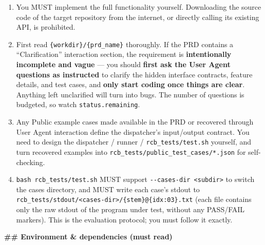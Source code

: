 \begin{promptbox}
\begin{enumerate}
\item You MUST implement the full functionality yourself. Downloading the source code of the target repository from the internet, or directly calling its existing API, is prohibited.
\item First read \texttt{\{workdir\}/\{prd\_name\}} thoroughly. If the PRD contains a ``Clarification'' interaction section, the requirement is \textbf{intentionally incomplete and vague} --- you should \textbf{first ask the User Agent questions as instructed} to clarify the hidden interface contracts, feature details, and test cases, and \textbf{only start coding once things are clear}. Anything left unclarified will turn into bugs. The number of questions is budgeted, so watch \texttt{status.remaining}.
\item Any Public example cases made available in the PRD or recovered through User Agent interaction define the dispatcher's input/output contract. You need to design the dispatcher / runner / \texttt{rcb\_tests/test.sh} yourself, and turn recovered examples into \texttt{rcb\_tests/public\_test\_cases/*.json} for self-checking.
\item \texttt{bash rcb\_tests/test.sh} MUST support \texttt{-{}-cases-dir <subdir>} to switch the cases directory, and MUST write each case's stdout to \texttt{rcb\_tests/stdout/<cases-dir>/\{stem\}@\{idx:03\}.txt} (each file contains only the raw stdout of the program under test, without any PASS/FAIL markers). This is the evaluation protocol; you must follow it exactly.
\end{enumerate}

\textbf{\#\# Environment \& dependencies (must read)}


\end{promptbox}
